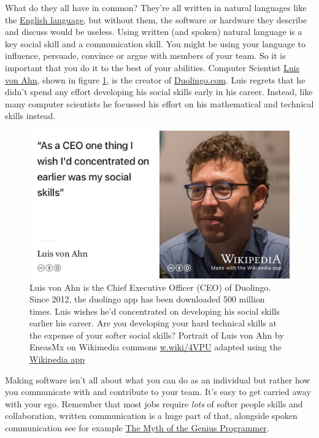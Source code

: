 \documentclass[
]{book}
\begin{document}
What do they all have in common? They're all written in natural languages like the \href{https://en.wikipedia.org/wiki/English_language}{English language}, but without them, the software or hardware they describe and discuss would be useless. Using written (and spoken) natural language is a key social skill and a communication skill. You might be using your language to influence, persuade, convince or argue with members of your team. So it is important that you do it to the best of your abilities. Computer Scientist \href{https://en.wikipedia.org/wiki/Luis_von_Ahn}{Luis von Ahn}, shown in figure \ref{fig:vonahn-fig}, is the creator of \href{https://www.duolingo.com/}{Duolingo.com}. Luis regrets that he didn't spend any effort developing his social skills early in his career. Instead, like many computer scientists he focussed his effort on his mathematical and technical skills instead. \citep{vonahn}

\begin{figure}

{\centering \includegraphics[width=1\linewidth]{images/luis-von-ahn} 

}

\caption{Luis von Ahn is the Chief Executive Officer (CEO) of Duolingo. Since 2012, the duolingo app has been downloaded 500 million times. Luis wishes he'd concentrated on developing his social skills earlier his career. Are you developing your hard technical skills at the expense of your softer social skills? Portrait of Luis von Ahn by EneasMx on Wikimedia commons \href{https://w.wiki/4VPU}{w.wiki/4VPU} adapted using the \href{https://apps.apple.com/us/app/wikipedia/id324715238}{Wikipedia app}}\label{fig:vonahn-fig}
\end{figure}



Making software isn't all about what you can do as an individual but rather how you communicate with and contribute to your team. It's easy to get carried away with your ego. Remember that most jobs require \emph{lots} of softer people skills and collaboration, written communication is a huge part of that, alongside spoken communication see for example \href{https://www.youtube.com/watch?v=0SARbwvhupQ}{The Myth of the Genius Programmer}. \citep{Fitzpatrick}
\end{document}
